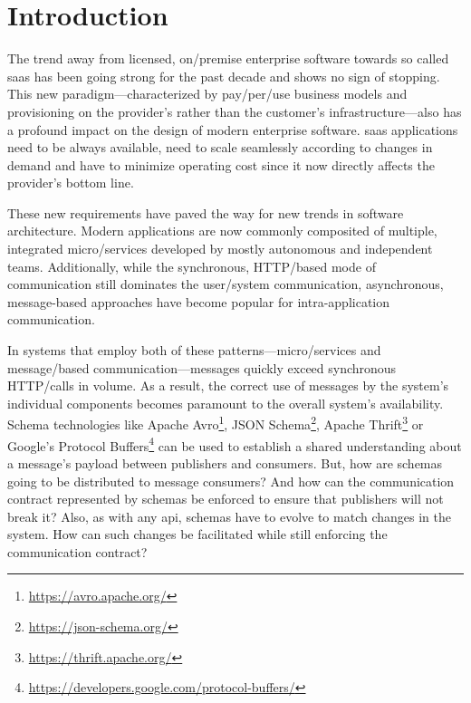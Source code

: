 
\section{Introduction}\label{sec:introduction}



The trend away from licensed, on\-/premise enterprise software towards so called \gls{saas} has been going strong for the past decade and shows no sign of stopping.
This new paradigm---characterized by pay\-/per\-/use business models and provisioning on the provider's rather than the customer's infrastructure---also has a profound impact on the design of modern enterprise software.
\gls{saas} applications need to be always available, need to scale seamlessly according to changes in demand and have to minimize operating cost since it now directly affects the provider's bottom line.

These new requirements have paved the way for new trends in software architecture.
Modern applications are now commonly composited of multiple, integrated micro\-/services developed by mostly autonomous and independent teams.
Additionally, while the synchronous, HTTP\-/based mode of communication still dominates the user\-/system communication, asynchronous, message-based approaches have become popular for intra-application communication.

In systems that employ both of these patterns---micro\-/services and message\-/based communication---messages quickly exceed synchronous HTTP\-/calls in volume.
As a result, the correct use of messages by the system's individual components becomes paramount to the overall system's availability.
Schema technologies like Apache Avro\footnote{\url{https://avro.apache.org/}}, JSON Schema\footnote{\url{https://json-schema.org/}}, Apache Thrift\footnote{\url{https://thrift.apache.org/}} or Google's Protocol Buffers\footnote{\url{https://developers.google.com/protocol-buffers/}} can be used to establish a shared understanding about a message's payload between publishers and consumers.
But, how are schemas going to be distributed to message consumers?
And how can the communication contract represented by schemas be enforced to ensure that publishers will not break it?
Also, as with any \gls{api}, schemas have to evolve to match changes in the system.
How can such changes be facilitated while still enforcing the communication contract?

